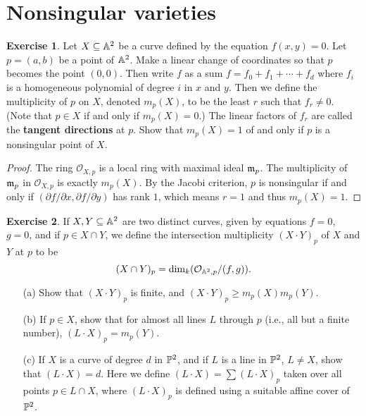 \documentclass[11pt]{book}
\theoremstyle{definition}
\newtheorem{exercise}{Exercise}[section]
\begin{document}
\section{Nonsingular varieties}
\begin{exercise}
Let $X\sub\A^2$ be a curve defined by the equation $f(x,y)=0$. Let $p=(a,b)$ be a point of $\A^2$. Make a linear change of coordinates so that $p$ becomes the point $(0,0)$. Then write $f$ as a sum $f=f_0+f_1+\cdots+f_d$ where $f_i$ is a homogeneous polynomial of degree $i$ in $x$ and $y$. Then we define the multiplicity of $p$ on $X$, denoted $m_p(X)$, to be the least $r$ such that $f_r\neq 0$. (Note that $p\in X$ if and only if $m_p(X)=0$.) The linear factors of $f_r$ are called the \textbf{tangent directions} at $p$. Show that $m_p(X)=1$ of and only if $p$ is a nonsingular point of $X$.
\end{exercise}
\begin{proof}
The ring $\mathcal{O}_{X,p}$ is a local ring with maximal ideal $\m_p$. The multiplicity of $\m_p$ in $\mathcal{O}_{X,p}$ is exactly $m_p(X)$. By the Jacobi criterion, $p$ is nonsingular if and only if $(\partial f/\partial x,\partial f/\partial y)$ has rank $1$, which means $r=1$ and thus $m_p(X)=1$.
\end{proof}
\begin{exercise}
If $X,Y\sub\A^2$ are two distinct curves, given by equations $f=0$, $g=0$, and if $p\in X\cap Y$, we define the intersection multiplicity $(X\cdot Y)_p$ of $X$ and $Y$ at $p$ to be 
\[(X\cap Y)_p=\dim_k(\mathcal{O}_{\A^2,p}/(f,g)).\]
\begin{itemize}
\item[(a)] Show that $(X\cdot Y)_p$ is finite, and $(X\cdot Y)_p\geq m_p(X)m_p(Y)$.
\item[(b)] If $p\in X$, show that for almost all lines $L$ through $p$ (i.e., all but a finite number), $(L\cdot X)_p=m_p(Y)$.
\item[(c)] If $X$ is a curve of degree $d$ in $\P^2$, and if $L$ is a line in $\P^2$, $L\neq X$, show that $(L\cdot X)=d$. Here we define $(L\cdot X)=\sum(L\cdot X)_p$ taken over all points $p\in L\cap X$, where $(L\cdot X)_p$ is defined using a suitable affine cover of $\P^2$.
\end{itemize}
\end{exercise}
\end{document}
